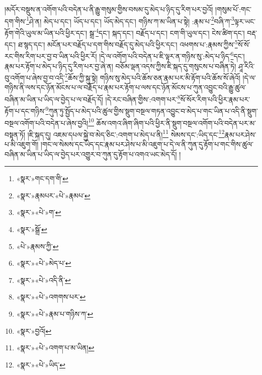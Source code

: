 །མདོར་བསྡུས་ན་འགོག་པའི་བདེན་པ་ནི་རྒྱུ་གསུམ་གྱིས་བསམ་དུ་མེད་པ་ཉིད་དུ་རིག་པར་བྱའོ། །གསུམ་པོ་:གང་དག་གིས་\footnote{«སྣར་»གང་དག་གི་}ཤེ་ན། མེད་པ་དང་། ཡོད་པ་དང་། ཡོད་མེད་དང་། གཉིས་ཀ་མ་ཡིན་པ་སྟེ། :རྣམ་པ་\footnote{«སྣར་»རྣམཔར་«པེ་»རྣམཔ་}བཞི་ཀ་\footnote{«སྣར་»«པེ་»ག་}ལྟར་ཡང་རྟོག་གེའི་ཡུལ་མ་ཡིན་པའི་ཕྱིར་དང་། སྒྲ་\footnote{«སྣར་»སྒྲོ་}དང་། སྐད་དང་། བརྗོད་པ་དང་། ངག་གི་ཡུལ་དང་། ངེས་ཚིག་དང་། བརྡ་དང་། ཐ་སྙད་དང་། མངོན་པར་བརྗོད་པ་དག་གིས་བརྗོད་དུ་མེད་པའི་ཕྱིར་དང་། འཕགས་པ་:རྣམས་ཀྱིས་\footnote{«པེ་»རྣམས་ཀྱི་}སོ་སོ་རང་གིས་རིག་པར་བྱ་བ་ཡིན་པའི་ཕྱིར་རོ། །དེ་ལ་འགོག་པའི་བདེན་པ་ཇི་ལྟར་ན་གཉིས་སུ་:མེད་པ་ཉིད་\footnote{«སྣར་»«པེ་»མེད་པ་}དང་། རྣམ་པར་རྟོག་པ་མེད་པ་ཉིད་དུ་རིག་པར་བྱ་ཞེ་ན། བཅོམ་ལྡན་འདས་ཀྱིས་ཇི་སྐད་དུ་གསུངས་པ་བཞིན་ཏེ། ཤཱ་རིའི་བུ་འགོག་པ་ཞེས་བྱ་བ་འདི་\footnote{«སྣར་»«པེ་»འདི་ནི་}ཆོས་ཀྱི་སྐུ་སྟེ། གཉིས་སུ་མེད་པའི་ཆོས་ཅན་རྣམ་པར་མི་རྟོག་པའི་ཆོས་སོ་ཞེའོ། །དེ་ལ་གཉིས་ནི་ལས་དང་ཉོན་མོངས་པ་ལ་བརྗོད་པ་རྣམ་པར་རྟོག་པ་ལས་དང་ཉོན་མོངས་པ་ཀུན་འབྱུང་བའི་རྒྱུ་ཚུལ་བཞིན་མ་ཡིན་པ་ཡིད་ལ་བྱེད་པ་ལ་བརྗོད་དོ། །དེ་རང་བཞིན་གྱིས་:འགག་པར་\footnote{«སྣར་»«པེ་»འགགས་པར་}སོ་སོར་རིག་པའི་ཕྱིར་རྣམ་པར་རྟོག་པ་དང་གཉིས་\footnote{«སྣར་»«པེ་»རྣམ་པ་གཉིས་ཀ་}ཀུན་ཏུ་སྤྱོད་པ་མེད་པའི་ཚུལ་གྱིས་སྡུག་བསྔལ་གཏན་འབྱུང་བ་མེད་པ་གང་ཡིན་པ་འདི་ནི་སྡུག་བསྔལ་འགོག་པའི་བདེན་པ་ཞེས་བྱའི།\footnote{«སྣར་»བྱའོ།} ཆོས་འགའ་ཞིག་ཞིག་པའི་ཕྱིར་ནི་སྡུག་བསྔལ་འགོག་པའི་བདེན་པར་མ་བསྟན་ཏོ། །ཇི་སྐད་དུ། འཇམ་དཔལ་སྐྱེ་བ་མེད་ཅིང་:འགག་པ་མེད་པ་ནི།\footnote{«སྣར་»«པེ་»འགག་པ་མ་ཡིན།} སེམས་དང་:ཡིད་དང་\footnote{«སྣར་»«པེ་»ཡིད་}རྣམ་པར་ཤེས་པ་མི་འཇུག་གོ། །གང་ལ་སེམས་དང་ཡིད་དང་རྣམ་པར་ཤེས་པ་མི་འཇུག་པ་དེ་ལ་ནི་ཀུན་དུ་རྟོག་པ་གང་གིས་ཚུལ་བཞིན་མ་ཡིན་པ་ཡིད་ལ་བྱེད་པར་འགྱུར་བ་ཀུན་དུ་རྟོག་པ་འགའ་ཡང་མེད་དོ། །
